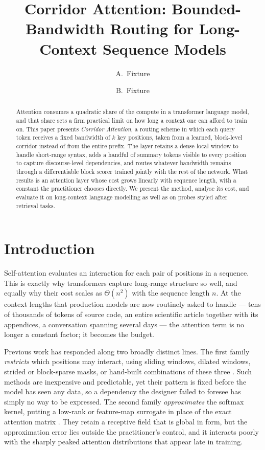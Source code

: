 \documentclass[11pt]{article}
\title{Corridor Attention: Bounded-Bandwidth Routing for Long-Context
Sequence Models}
\author{A.~Fixture \and B.~Fixture}
\date{}
\begin{document}
\maketitle

\begin{abstract}
Attention consumes a quadratic share of the compute in a transformer language
model, and that share sets a firm practical limit on how long a context one
can afford to train on. This paper presents \emph{Corridor Attention}, a
routing scheme in which each query token receives a fixed bandwidth of $k$ key
positions, taken from a learned, block-level corridor instead of from the
entire prefix. The layer retains a dense local window to handle short-range
syntax, adds a handful of summary tokens visible to every position to capture
discourse-level dependencies, and routes whatever bandwidth remains through a
differentiable block scorer trained jointly with the rest of the network.
What results is an attention layer whose cost grows linearly with sequence
length, with a constant the practitioner chooses directly. We present the
method, analyse its cost, and evaluate it on long-context language modelling
as well as on probes styled after retrieval tasks.
\end{abstract}

\section{Introduction}\label{sec:intro}

Self-attention \citep{vaswani2017attention} evaluates an interaction for each
pair of positions in a sequence. This is exactly why transformers capture
long-range structure so well, and equally why their cost scales as
$\Theta(n^2)$ with the sequence length $n$. At the context lengths that
production models are now routinely asked to handle --- tens of thousands of
tokens of source code, an entire scientific article together with its
appendices, a conversation spanning several days --- the attention term is no
longer a constant factor; it becomes the budget.

Previous work has responded along two broadly distinct lines. The first
family \emph{restricts} which positions may interact, using sliding windows,
dilated windows, strided or block-sparse masks, or hand-built combinations of
these three \citep{child2019sparse,beltagy2020longformer,zaheer2020bigbird}.
Such methods are inexpensive and predictable, yet their pattern is fixed
before the model has seen any data, so a dependency the designer failed to
foresee has simply no way to be expressed. The second family
\emph{approximates} the softmax kernel, putting a low-rank or feature-map
surrogate in place of the exact attention matrix
\citep{wang2020linformer,katharopoulos2020linear,choromanski2021performer}. They
retain a receptive field that is global in form, but the approximation error
lies outside the practitioner's control, and it interacts poorly with the
sharply peaked attention distributions that appear late in training.
\end{document}
